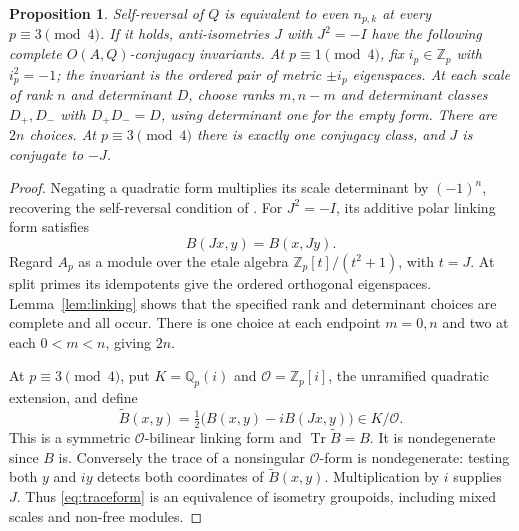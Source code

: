 \documentclass{amsart}
\newtheorem{proposition}[theorem]{Proposition}
\theoremstyle{definition}\newtheorem{definition}[theorem]{Definition}
\theoremstyle{remark}\newtheorem{remark}[theorem]{Remark}
\newcommand{\Z}{\mathbb Z}\newcommand{\Q}{\mathbb Q}
\newcommand{\Tr}{\operatorname{Tr}}\newcommand{\Nm}{\operatorname{Nm}}
\begin{document}
\begin{proposition}\label{prop:J}
Self-reversal of $Q$ is equivalent to even $n_{p,k}$ at every
$p\equiv3\pmod4$. If it holds, anti-isometries $J$ with $J^2=-I$
have the following complete $O(A,Q)$-conjugacy invariants.
At $p\equiv1\pmod4$, fix $i_p\in\Z_p$ with $i_p^2=-1$;
the invariant is the ordered pair of metric $\pm i_p$ eigenspaces.
At each scale of rank $n$ and determinant $D$, choose ranks
$m,n-m$ and determinant classes $D_+,D_-$ with $D_+D_-=D$,
using determinant one for the empty form. There are $2n$ choices.
At $p\equiv3\pmod4$ there is exactly one conjugacy class, and
$J$ is conjugate to $-J$.
\end{proposition}
\begin{proof}
Negating a quadratic form multiplies its scale determinant by
$(-1)^n$, recovering the self-reversal condition of
\cite[Proposition 3.2]{GM}.
For $J^2=-I$, its additive polar linking form satisfies
\[
                         B(Jx,y)=B(x,Jy).
\]
Regard $A_p$ as a module over the etale algebra
$\Z_p[t]/(t^2+1)$, with $t=J$.
At split primes its idempotents give the ordered orthogonal
eigenspaces. Lemma~\ref{lem:linking} shows that the specified
rank and determinant choices are complete and all occur.
There is one choice at each endpoint $m=0,n$ and two at each
$0<m<n$, giving $2n$.

At $p\equiv3\pmod4$, put $K=\Q_p(i)$ and $\mathcal O=\Z_p[i]$,
the unramified quadratic extension, and define
\begin{equation}\label{eq:traceform}
 \widetilde B(x,y)=\tfrac12\bigl(B(x,y)-iB(Jx,y)\bigr)\in K/\mathcal O.
\end{equation}
This is a symmetric $\mathcal O$-bilinear linking form and
$\Tr\widetilde B=B$. It is nondegenerate since $B$ is.
Conversely the trace of a nonsingular $\mathcal O$-form is
nondegenerate: testing both $y$ and $iy$ detects both coordinates
of $\widetilde B(x,y)$. Multiplication by $i$ supplies $J$.
Thus \eqref{eq:traceform} is an equivalence of isometry groupoids,
including mixed scales and non-free modules.


\end{proof}
\end{document}
